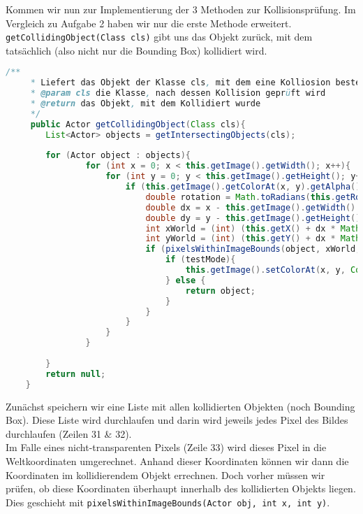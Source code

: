 \documentclass{pi1}
\begin{document}
Kommen wir nun zur Implementierung der 3 Methoden zur Kollisionsprüfung.
Im Vergleich zu Aufgabe 2 haben wir nur die erste Methode erweitert.\\
\texttt{getCollidingObject(Class cls)} gibt uns das Objekt zurück, mit dem tatsächlich (also nicht nur die Bounding Box) kollidiert wird.

\begin{lstlisting}[caption={\emph{getCollidingObject(Class cls)}-Methode}, firstnumber=22, language=Java]
/**
     * Liefert das Objekt der Klasse cls, mit dem eine Kolliosion besteht.
     * @param cls die Klasse, nach dessen Kollision geprüft wird
     * @return das Objekt, mit dem Kollidiert wurde
     */
     public Actor getCollidingObject(Class cls){
        List<Actor> objects = getIntersectingObjects(cls);
        
        for (Actor object : objects){
                for (int x = 0; x < this.getImage().getWidth(); x++){
                    for (int y = 0; y < this.getImage().getHeight(); y++){
                        if (this.getImage().getColorAt(x, y).getAlpha() > 0){
                            double rotation = Math.toRadians(this.getRotation());
                            double dx = x - this.getImage().getWidth() / 2;
                            double dy = y - this.getImage().getHeight() / 2;
                            int xWorld = (int) (this.getX() + dx * Math.cos(rotation) - dy * Math.sin(rotation));
                            int yWorld = (int) (this.getY() + dx * Math.sin(rotation) + dy * Math.cos(rotation));
                            if (pixelsWithinImageBounds(object, xWorld, yWorld) && visiblePixelAt(xWorld, yWorld, object)){
                                if (testMode){
                                    this.getImage().setColorAt(x, y, Color.RED);
                                } else {
                                    return object;
                                }
                            }                            
                        }
                    }
                }
            
        }
        return null;
    }
\end{lstlisting}

Zunächst speichern wir eine Liste mit allen kollidierten Objekten (noch Bounding Box). Diese Liste wird durchlaufen und darin wird jeweils jedes Pixel des Bildes durchlaufen (Zeilen 31 \& 32).\\
Im Falle eines nicht-transparenten Pixels (Zeile 33) wird dieses Pixel in die Weltkoordinaten umgerechnet. Anhand dieser Koordinaten können wir dann die Koordinaten im kollidierendem Objekt errechnen. Doch vorher müssen wir prüfen, ob diese Koordinaten überhaupt innerhalb des kollidierten Objekts liegen. Dies geschieht mit \texttt{pixelsWithinImageBounds(Actor obj, int x, int y)}.
\end{document}
